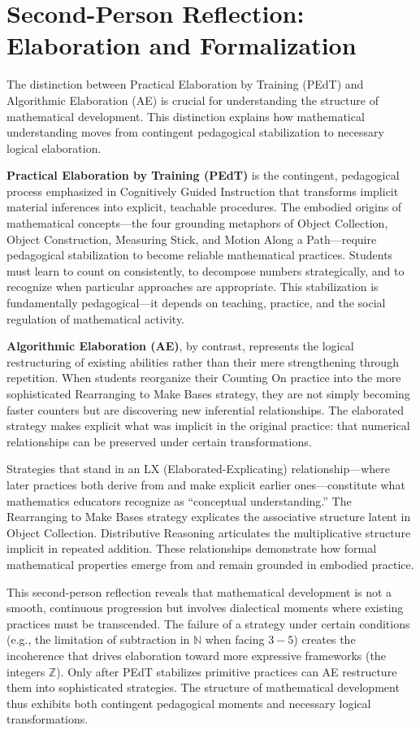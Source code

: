 \documentclass[12pt]{book}
\begin{document}
\section{Second-Person Reflection: Elaboration and Formalization}

The distinction between Practical Elaboration by Training (PEdT) and Algorithmic Elaboration (AE) is crucial for understanding the structure of mathematical development. This distinction explains how mathematical understanding moves from contingent pedagogical stabilization to necessary logical elaboration.

\textbf{Practical Elaboration by Training (PEdT)} is the contingent, pedagogical process emphasized in Cognitively Guided Instruction that transforms implicit material inferences into explicit, teachable procedures. The embodied origins of mathematical concepts---the four grounding metaphors of Object Collection, Object Construction, Measuring Stick, and Motion Along a Path---require pedagogical stabilization to become reliable mathematical practices. Students must learn to count on consistently, to decompose numbers strategically, and to recognize when particular approaches are appropriate. This stabilization is fundamentally pedagogical---it depends on teaching, practice, and the social regulation of mathematical activity.

\textbf{Algorithmic Elaboration (AE)}, by contrast, represents the logical restructuring of existing abilities rather than their mere strengthening through repetition. When students reorganize their Counting On practice into the more sophisticated Rearranging to Make Bases strategy, they are not simply becoming faster counters but are discovering new inferential relationships. The elaborated strategy makes explicit what was implicit in the original practice: that numerical relationships can be preserved under certain transformations.

Strategies that stand in an LX (Elaborated-Explicating) relationship---where later practices both derive from and make explicit earlier ones---constitute what mathematics educators recognize as \enquote{conceptual understanding.} The Rearranging to Make Bases strategy explicates the associative structure latent in Object Collection. Distributive Reasoning articulates the multiplicative structure implicit in repeated addition. These relationships demonstrate how formal mathematical properties emerge from and remain grounded in embodied practice.

This second-person reflection reveals that mathematical development is not a smooth, continuous progression but involves dialectical moments where existing practices must be transcended. The failure of a strategy under certain conditions (e.g., the limitation of subtraction in $\mathbb{N}$ when facing $3 - 5$) creates the incoherence that drives elaboration toward more expressive frameworks (the integers $\mathbb{Z}$). Only after PEdT stabilizes primitive practices can AE restructure them into sophisticated strategies. The structure of mathematical development thus exhibits both contingent pedagogical moments and necessary logical transformations.
\end{document}
